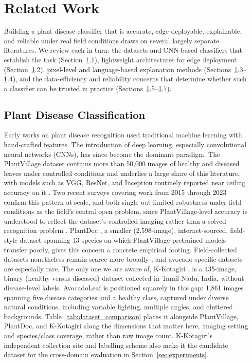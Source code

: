 \section{Related Work}
\label{sec:related_work}

Building a plant disease classifier that is accurate, edge-deployable, explainable, and reliable under real field conditions draws on several largely separate literatures. We review each in turn: the datasets and CNN-based classifiers that establish the task (Section~\ref{sec:related_work}.1), lightweight architectures for edge deployment (Section~\ref{sec:related_work}.2), pixel-level and language-based explanation methods (Sections~\ref{sec:related_work}.3--\ref{sec:related_work}.4), and the data-efficiency and reliability concerns that determine whether such a classifier can be trusted in practice (Sections~\ref{sec:related_work}.5--\ref{sec:related_work}.7).

\subsection{Plant Disease Classification}
Early works on plant disease recognition used traditional machine learning with hand‑crafted features. The introduction of deep learning, especially convolutional neural networks (CNNs), has since become the dominant paradigm. The PlantVillage dataset \citep{hughes2015plant} contains more than 50,000 images of healthy and diseased leaves under controlled conditions and underlies a large share of this literature, with models such as VGG, ResNet, and Inception routinely reported near ceiling accuracy on it \citep{mohanty2016using}. Two recent surveys covering work from 2015 through 2023 confirm this pattern at scale, and both single out limited robustness under field conditions as the field's central open problem, since PlantVillage-level accuracy is understood to reflect the dataset's controlled imaging rather than a solved recognition problem \citep{shoaib2023review, mustofa2023review}. PlantDoc \citep{singh2020plantdoc}, a smaller (2,598-image), internet-sourced, field-style dataset spanning 13 species on which PlantVillage-pretrained models transfer poorly, gives this concern a concrete empirical footing. Field‑collected datasets nonetheless remain scarce more broadly \citep{barbedo2019plant}, and avocado-specific datasets are especially rare. The only one we are aware of, K-Kotagiri \citeyearpar{kotagiri2024avocado}, is a 435-image, binary (healthy versus diseased) dataset collected in Tamil Nadu, India, without disease-level labels. AvocadoLeaf is positioned squarely in this gap: 1,861 images spanning five disease categories and a healthy class, captured under diverse natural conditions, including variable lighting, multiple angles, and cluttered backgrounds. Table~\ref{tab:dataset_comparison} places it alongside PlantVillage, PlantDoc, and K-Kotagiri along the dimensions that matter here, imaging setting and species/class coverage, rather than raw image count. K-Kotagiri's independent collection site and labelling scheme also make it the candidate dataset for the cross-domain evaluation in Section~\ref{sec:experiments}.

